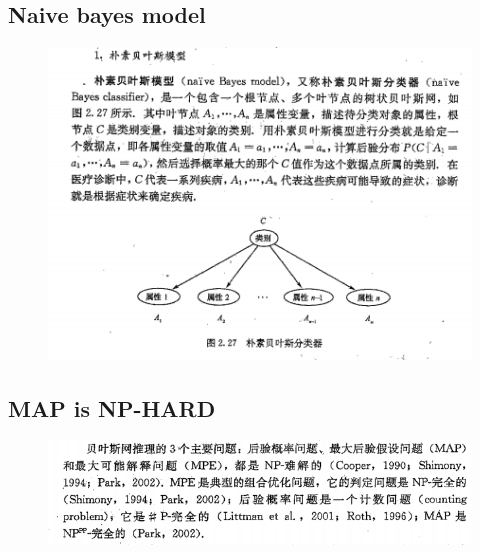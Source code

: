 \documentclass{article}
\begin{document}
\subsection{Naive bayes model}
\begin{figure}[h]
\centering
\includegraphics[width=1.05\columnwidth]{figs/naive_bayes.png}
\end{figure}

\subsection{MAP is NP-HARD}
\begin{figure}[h]
    \centering
    \includegraphics[width=1.05\columnwidth]{figs/nphard.png}
\end{figure}
\end{document}

